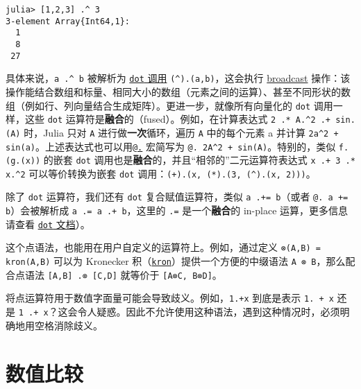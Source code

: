 \begin{verbatim}
julia> [1,2,3] .^ 3
3-element Array{Int64,1}:
  1
  8
 27
\end{verbatim}



具体来说，\texttt{a .{\textasciicircum} b} 被解析为 \hyperlink{17801130558550430478}{\texttt{dot} 调用} \texttt{({\textasciicircum}).(a,b)}，这会执行 \href{@ref Broadcasting}{broadcast} 操作：该操作能结合数组和标量、相同大小的数组（元素之间的运算）、甚至不同形状的数组（例如行、列向量结合生成矩阵）。更进一步，就像所有向量化的 \texttt{dot} 调用一样，这些 \texttt{dot} 运算符是\textbf{融合}的（fused）。例如，在计算表达式 \texttt{2 .* A.{\textasciicircum}2 .+ sin.(A)} 时，Julia 只对 \texttt{A} 进行做\textbf{一次}循环，遍历 \texttt{A} 中的每个元素 a 并计算 \texttt{2a{\textasciicircum}2 + sin(a)}。上述表达式也可以用\hyperlink{16688502228717894452}{\texttt{@.}} 宏简写为 \texttt{@. 2A{\textasciicircum}2 + sin(A)}。特别的，类似 \texttt{f.(g.(x))} 的嵌套 \texttt{dot} 调用也是\textbf{融合}的，并且“相邻的”二元运算符表达式 \texttt{x .+ 3 .* x.{\textasciicircum}2} 可以等价转换为嵌套 \texttt{dot} 调用：\texttt{(+).(x, (*).(3, ({\textasciicircum}).(x, 2)))}。



除了 \texttt{dot} 运算符，我们还有 \texttt{dot} 复合赋值运算符，类似 \texttt{a .+= b}（或者 \texttt{@. a += b}）会被解析成 \texttt{a .= a .+ b}，这里的 \texttt{.=} 是一个\textbf{融合}的 in-place 运算，更多信息请查看 \hyperlink{17801130558550430478}{\texttt{dot} 文档}）。



这个点语法，也能用在用户自定义的运算符上。例如，通过定义 \texttt{⊗(A,B) = kron(A,B)} 可以为 Kronecker 积（\hyperlink{14153417388267953812}{\texttt{kron}}）提供一个方便的中缀语法 \texttt{A ⊗ B}，那么配合点语法 \texttt{[A,B] .⊗ [C,D]} 就等价于 \texttt{[A⊗C, B⊗D]}。



将点运算符用于数值字面量可能会导致歧义。例如，\texttt{1.+x} 到底是表示 \texttt{1. + x} 还是 \texttt{1 .+ x}？这会令人疑惑。因此不允许使用这种语法，遇到这种情况时，必须明确地用空格消除歧义。



\hypertarget{2028216132575181376}{}


\section{数值比较}



